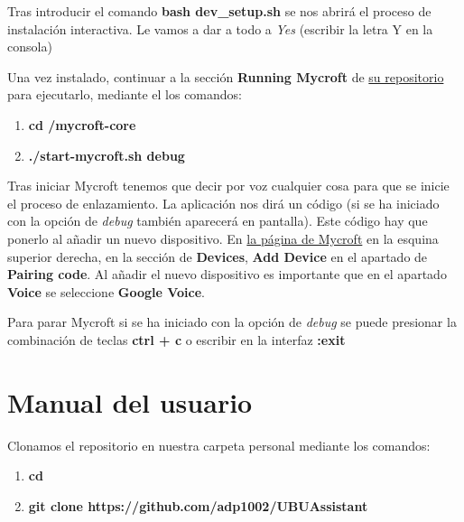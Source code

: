 Tras introducir el comando \textbf{bash dev\_setup.sh} se nos abrirá el proceso de instalación interactiva. Le vamos a dar a todo a \textit{Yes} (escribir la letra Y en la consola) 

Una vez instalado, continuar a la sección \textbf{Running Mycroft} de \href{https://github.com/MycroftAI/mycroft-core}{su repositorio} para ejecutarlo, mediante el los comandos:
\begin{enumerate}
	\item \textbf{cd \detokenize{~}/mycroft-core}
	\item \textbf{./start-mycroft.sh debug}
\end{enumerate}

Tras iniciar Mycroft tenemos que decir por voz cualquier cosa para que se inicie el proceso de enlazamiento. La aplicación nos dirá un código (si se ha iniciado con la opción de \textit{debug} también aparecerá en pantalla). Este código hay que ponerlo al añadir un nuevo dispositivo. En \href{https://home.mycroft.ai}{la página de Mycroft} en la esquina superior derecha, en la sección de \textbf{Devices}, \textbf{Add Device} en el apartado de \textbf{Pairing code}. Al añadir el nuevo dispositivo es importante que en el apartado \textbf{Voice} se seleccione \textbf{Google Voice}.

Para parar Mycroft si se ha iniciado con la opción de \textit{debug} se puede presionar la combinación de teclas \textbf{ctrl + c} o escribir en la interfaz \textbf{:exit}


\section{Manual del usuario}



Clonamos el repositorio en nuestra carpeta personal mediante los comandos:
\begin{enumerate}
	\item \textbf{cd \detokenize{~}}
	\item \textbf{git clone https://github.com/adp1002/UBUAssistant}
\end{enumerate}

